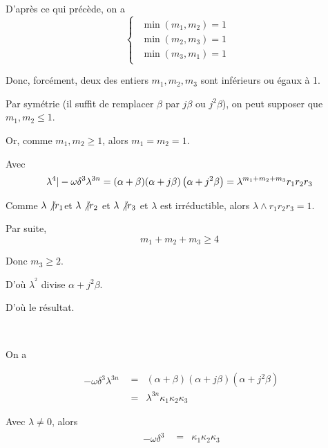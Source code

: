 D'apr{\`e}s ce qui pr{\'e}c{\`e}de, on a
\[ \left\{\begin{array}{l}
     \begin{array}{c}
       \min (m_1, m_2) = 1\\
       \min (m_2, m_3) = 1\\
       \min (m_3, m_1) = 1
     \end{array}
   \end{array}\right. \]


Donc, forc{\'e}ment, deux des entiers $m_1, m_2, m_3$ sont inf{\'e}rieurs ou
{\'e}gaux {\`a} 1.

Par sym{\'e}trie (il suffit de remplacer $\beta$ par $j \beta$ ou $j^2
\beta$), on peut supposer que $m_1, m_2 \leqslant 1$.

Or, comme $m_1, m_2 \geqslant 1$, alors $m_1 = m_2 = 1$.

Avec
\[ \lambda^4 |  - \omega \delta^3 \lambda^{3 n} = (\alpha + \beta)
   (\alpha + j \beta) \left( \alpha + j^2 \beta \right) = \lambda^{m_1 + m_2 +
   m_3} r_1 r_2 r_3 \]


Comme $\lambda \not{| } r_1 $et $\lambda \not{| } r_2$
et $\lambda \not{| } r_3$ et $\lambda$ est irr{\'e}ductible, alors
$\lambda \wedge r_1 r_2 r_3 = 1$.

Par suite,
\[ m_1 + m_2 + m_3 \geqslant 4 \]


Donc $m_3 \geqslant 2$.

D'o{\`u} $\lambda^{^2}$ divise $\alpha + j^2 \beta$.

D'o{\`u} le r{\'e}sultat.

\

 On a


\[ \begin{array}{lll}
     \begin{array}{l}
       - \omega \delta^3 \lambda^{3 n}
     \end{array} & = & (\alpha + \beta) (\alpha + j \beta) \left( \alpha + j^2
     \beta \right)\\
     & = & \lambda^{3 n} \kappa_1 \kappa_2 \kappa_3
   \end{array} \]


Avec $\lambda \neq 0$, alors
\[ \begin{array}{lll}
     \begin{array}{l}
       - \omega \delta^3
     \end{array} & = & \kappa_1 \kappa_2 \kappa_3
   \end{array} \]


